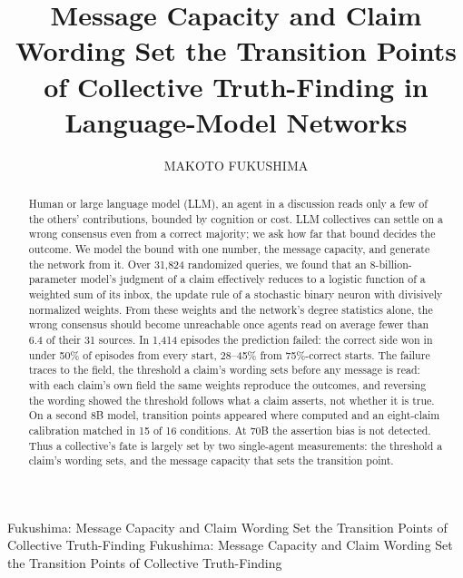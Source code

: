 \documentclass{ieeeaccess}
\begin{document}

\title{Message Capacity and Claim Wording Set the Transition Points of Collective Truth-Finding in Language-Model Networks}
\author{\uppercase{Makoto Fukushima}}

\address[1]{Research Division, Honda Research Institute Japan Co., Ltd., Wako, Saitama 351-0188, Japan}

\markboth
{Fukushima: Message Capacity and Claim Wording Set the Transition Points of Collective Truth-Finding}
{Fukushima: Message Capacity and Claim Wording Set the Transition Points of Collective Truth-Finding}


\begin{abstract}
Human or large language model (LLM), an agent in a discussion reads only a few of the others' contributions, bounded by cognition or cost. LLM collectives can settle on a wrong consensus even from a correct majority; we ask how far that bound decides the outcome. We model the bound with one number, the message capacity, and generate the network from it. Over 31,824 randomized queries, we found that an 8-billion-parameter model's judgment of a claim effectively reduces to a logistic function of a weighted sum of its inbox, the update rule of a stochastic binary neuron with divisively normalized weights. From these weights and the network's degree statistics alone, the wrong consensus should become unreachable once agents read on average fewer than 6.4 of their 31 sources. In 1,414 episodes the prediction failed: the correct side won in under 50\% of episodes from every start, 28--45\% from 75\%-correct starts. The failure traces to the field, the threshold a claim's wording sets before any message is read: with each claim's own field the same weights reproduce the outcomes, and reversing the wording showed the threshold follows what a claim asserts, not whether it is true. On a second 8B model, transition points appeared where computed and an eight-claim calibration matched in 15 of 16 conditions. At 70B the assertion bias is not detected. Thus a collective's fate is largely set by two single-agent measurements: the threshold a claim's wording sets, and the message capacity that sets the transition point.
\end{abstract}
\end{document}
